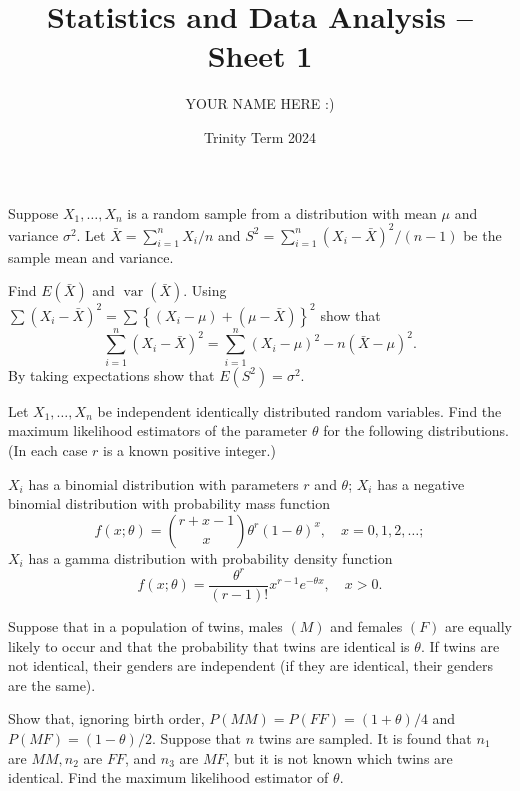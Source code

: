 \documentclass[answers]{exam}
\title{Statistics and Data Analysis -- Sheet 1}
\author{YOUR NAME HERE :)}
\date{Trinity Term 2024}
\begin{document}
\maketitle
\begin{questions}

\question%
Suppose $X_{1}, \ldots, X_{n}$ is a random sample from a distribution with mean $\mu$ and variance $\sigma^{2}$. Let $\bar{X}=\sum_{i=1}^{n} X_{i} / n$ and $S^{2}=\sum_{i=1}^{n}\left(X_{i}-\bar{X}\right)^{2} /(n-1)$ be the sample mean and variance.
\begin{subparts}
\subpart Find $E(\bar{X})$ and $\operatorname{var}(\bar{X})$.
\subpart Using $\sum\left(X_{i}-\bar{X}\right)^{2}=\sum\left\{\left(X_{i}-\mu\right)+(\mu-\bar{X})\right\}^{2}$ show that \[
	\sum_{i=1}^{n}\left(X_{i}-\bar{X}\right)^{2}=\sum_{i=1}^{n}\left(X_{i}-\mu\right)^{2}-n(\bar{X}-\mu)^{2}.
\] By taking expectations show that $E\left(S^{2}\right)=\sigma^{2}$.
\end{subparts}



\question%
Let $X_{1}, \ldots, X_{n}$ be independent identically distributed random variables. Find the maximum likelihood estimators of the parameter $\theta$ for the following distributions. (In each case $r$ is a known positive integer.)
\begin{subparts}
\subpart $X_{i}$ has a binomial distribution with parameters $r$ and $\theta$;
\subpart $X_{i}$ has a negative binomial distribution with probability mass function \[
	f(x;\theta)=\binom{r+x-1}x \theta^{r}(1-\theta)^{x}, \quad x=0,1,2, \ldots;
\]
\subpart $X_{i}$ has a gamma distribution with probability density function \[
	f(x ; \theta)=\frac{\theta^{r}}{(r-1) !} x^{r-1} e^{-\theta x}, \quad x>0 .
\]
\end{subparts}



\question%
Suppose that in a population of twins, males $(M)$ and females $(F)$ are equally likely to occur and that the probability that twins are identical is $\theta$. If twins are not identical, their genders are independent (if they are identical, their genders are the same).
\begin{subparts}
\subpart Show that, ignoring birth order, $P(M M)=P(F F)=(1+\theta) / 4$ and $P(M F)=(1-\theta) / 2$.
\subpart Suppose that $n$ twins are sampled. It is found that $n_{1}$ are $M M, n_{2}$ are $F F$, and $n_{3}$ are $M F$, but it is not known which twins are identical. Find the maximum likelihood estimator of $\theta$.
\end{subparts}




\end{questions}
\end{document}

